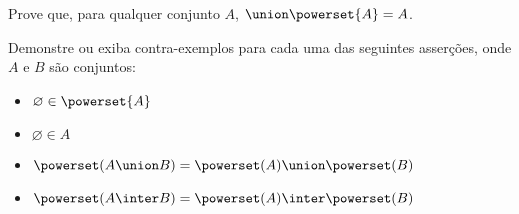 \begin{exercise}
Prove que, para qualquer conjunto $A$, $\union \powerset{A} = A$. 
\end{exercise}

\begin{exercise}
Demonstre ou exiba contra-exemplos para cada uma das seguintes asserções, onde $A$ e $B$ são conjuntos:
\begin{itemize}
  \item $\varnothing \in \powerset{A}$
  \item $\varnothing \in A$
  \item $\powerset(A \union B) = \powerset(A) \union \powerset(B)$
  \item $\powerset(A \inter B) = \powerset(A) \inter \powerset(B)$
\end{itemize}
\end{exercise}
